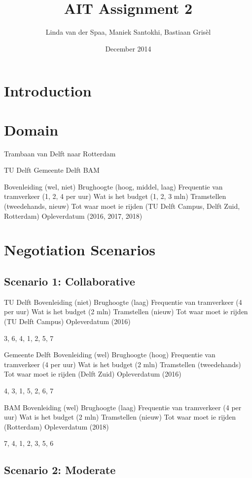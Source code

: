 \documentclass{article}
\title{AIT Assignment 2}
\author{Linda van der Spaa, Maniek Santokhi, Bastiaan Gris\`el}
\date{December 2014}
\begin{document}
\maketitle

\section{Introduction}

\section{Domain}
Trambaan van Delft naar Rotterdam

TU Delft
Gemeente Delft
BAM

Bovenleiding (wel, niet)
Brughoogte (hoog, middel, laag)
Frequentie van tramverkeer (1, 2, 4 per uur)
Wat is het budget (1, 2, 3 mln)
Tramstellen (tweedehands, nieuw)
Tot waar moet ie rijden (TU Delft Campus, Delft Zuid, Rotterdam)
Opleverdatum (2016, 2017, 2018)

\section{Negotiation Scenarios}

\subsection{Scenario 1: Collaborative}
TU Delft
Bovenleiding (niet)
Brughoogte (laag)
Frequentie van tramverkeer (4 per uur)
Wat is het budget (2 mln)
Tramstellen (nieuw)
Tot waar moet ie rijden (TU Delft Campus)
Opleverdatum (2016)

3, 6, 4, 1, 2, 5, 7

Gemeente Delft
Bovenleiding (wel)
Brughoogte (hoog)
Frequentie van tramverkeer (4 per uur)
Wat is het budget (2 mln)
Tramstellen (tweedehands)
Tot waar moet ie rijden (Delft Zuid)
Opleverdatum (2016)

4, 3, 1, 5, 2, 6, 7

BAM
Bovenleiding (wel)
Brughoogte (laag)
Frequentie van tramverkeer (4 per uur)
Wat is het budget (2 mln)
Tramstellen (nieuw)
Tot waar moet ie rijden (Rotterdam)
Opleverdatum (2018)

7, 4, 1, 2, 3, 5, 6

\subsection{Scenario 2: Moderate}
\end{document}
